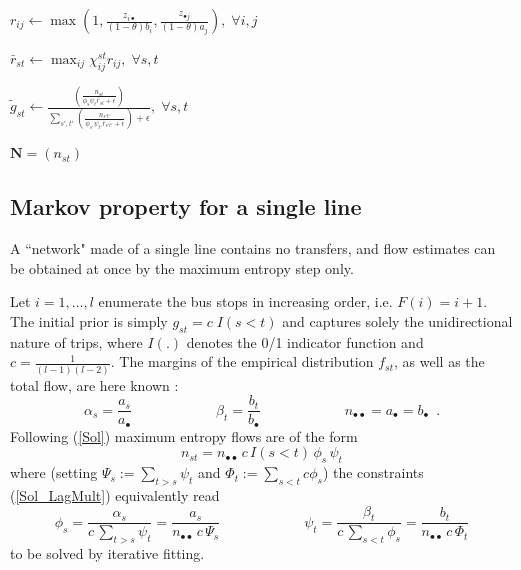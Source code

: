 \documentclass{bmcart}
\begin{document}
\begin{algorithm}[h]
\begin{algorithmic}[1]
		\State $r_{ij} \leftarrow \max \left(1, \frac{z_{i \bullet}}{(1 - \theta)b_i}, \frac{z_{\bullet j}}{(1 - \theta)a_j} \right), \; \forall i,j$
		
		\State $\bar{r}_{st} \leftarrow \max_{ij} \chi_{ij}^{st} r_{ij}, \; \forall s,t$
		
		\State $\widetilde{g}_{st} \leftarrow \frac{\left( \frac{n_{st}}{\phi_s \psi_t \bar{r}_{st} + \epsilon} \right)}{\sum_{s',t'} \left( \frac{n_{s't'}}{\phi_{s'} \psi_{t'}\bar{r}_{s't'} + \epsilon} \right) + \epsilon}, \; \forall s,t$ 
		
		\EndWhile
		\State \Return $\mathbf{N} = (n_{st})$
	\end{algorithmic}
\end{algorithm}


\subsection{Markov property for a single line}
\label{Single line}
A ``network" made of a single line contains no transfers, and flow estimates can be obtained at once by the maximum entropy step only.


Let  $i=1,\ldots, l$ enumerate the bus stops in increasing order,  i.e. $F(i)=i+1$. The initial prior is simply $g_{st}=c\; I(s<t)$ and captures solely the unidirectional nature of trips,  where $I(.)$ denotes the 0/1  indicator function and $c=\frac{1}{(l-1)(l-2)}$.   The margins of the empirical distribution $f_{st}$, as well as the total flow, are here known : 
\begin{displaymath}
\alpha_s=\frac{a_s}{a_\bullet}\qquad\qquad\qquad \beta_t=\frac{b_t}{b_\bullet}\qquad\qquad\qquad n_{\bullet\bullet}=a_{\bullet}=b_\bullet\enspace. 
\end{displaymath}
Following  (\ref{Sol}) maximum entropy flows are of the form
\begin{equation}
\label{nosignle}
n_{st}= n_{\bullet\bullet}\,  c\, I(s<t)\, \phi_s\,  \psi_t 
\end{equation}
where (setting $\Psi_s:=\sum_{t>s}\psi_t$ and $\Phi_t:=\sum_{s<t}c\phi_s$) the constraints (\ref{Sol_LagMult}) equivalently read
\begin{equation}
\label{dis embarking constraints}
\phi_s=\frac{\alpha_s}{c\, \sum_{t>s}\psi_t}=\frac{a_s}{n_{\bullet\bullet}\,  c\, \Psi_s}
\qquad\qquad\qquad
\psi_t=\frac{\beta_t}{c\, \sum_{s<t}\phi_s}=\frac{b_t}{n_{\bullet\bullet}\, c\, \Phi_t}
\end{equation}
to be solved by iterative fitting. 
\end{document}
